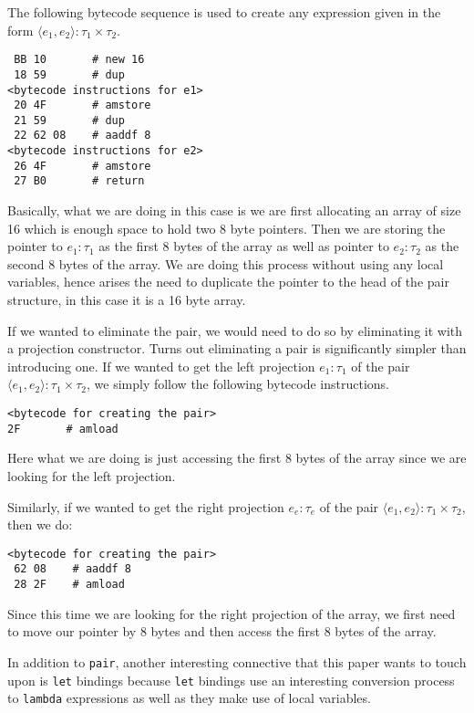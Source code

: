 \documentclass{acm_proc_article-sp}
\newcommand{\m}[1]{\texttt{#1}}
\begin{document}
The following bytecode sequence is used to create any expression given in the form $\langle e_1, e_2\rangle : \tau_1 \times \tau_2$.
\begin{verbatim}
 BB 10       # new 16          
 18 59       # dup             
<bytecode instructions for e1>
 20 4F       # amstore      
 21 59       # dup             
 22 62 08    # aaddf 8    
<bytecode instructions for e2>         
 26 4F       # amstore      
 27 B0       # return 
\end{verbatim}

Basically, what we are doing in this case is we are first allocating an array of size 16 which is enough space to hold two 8 byte pointers. Then we are storing the pointer to $e_1 : \tau_1$ as the first 8 bytes of the array as well as pointer to $e_2 : \tau_2$ as the second 8 bytes of the array. We are doing this process without using any local variables, hence arises the need to duplicate the pointer to the head of the pair structure, in this case it is a 16 byte array.

If we wanted to eliminate the pair, we would need to do so by eliminating it with a projection constructor. Turns out eliminating a pair is significantly simpler than introducing one. If we wanted to get the left projection $e_1 : \tau_1$ of the pair $\langle e_1, e_2\rangle : \tau_1 \times \tau_2$, we simply follow the following bytecode instructions.

\begin{verbatim}
<bytecode for creating the pair>
2F       # amload        
\end{verbatim}

Here what we are doing is just accessing the first 8 bytes of the array since we are looking for the left projection. 

Similarly, if we wanted to get the right projection $e_e : \tau_e$ of the pair $\langle e_1, e_2\rangle : \tau_1 \times \tau_2$, then we do:

\begin{verbatim}
<bytecode for creating the pair>
 62 08    # aaddf 8     
 28 2F    # amload  
\end{verbatim}

Since this time we are looking for the right projection of the array, we first need to move our pointer by 8 bytes and then access the first 8 bytes of the array.

In addition to \m{pair}, another interesting connective that this paper wants to touch upon is \m{let} bindings because \m{let} bindings use an interesting conversion process to \m{lambda} expressions as well as they make use of local variables.
\end{document}
